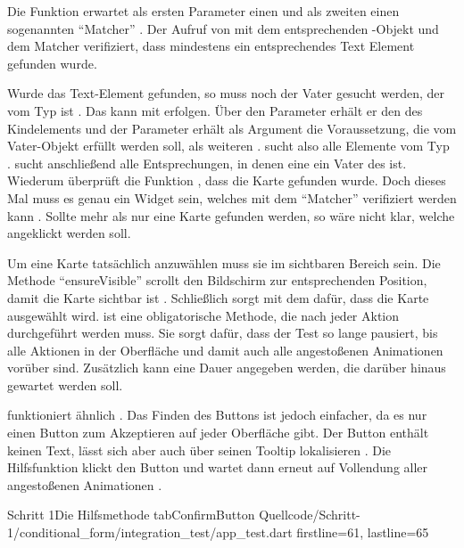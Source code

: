 Die Funktion  erwartet als ersten Parameter einen  und als zweiten einen sogenannten \enquote{Matcher} .
Der Aufruf von  mit dem entsprechenden -Objekt und dem Matcher  verifiziert, dass mindestens ein entsprechendes Text Element gefunden wurde.

Wurde das Text-Element gefunden, so muss noch der Vater gesucht werden, der vom Typ  ist .
Das kann mit  erfolgen. Über den Parameter  erhält er den  des Kindelements und der Parameter  erhält als Argument die Voraussetzung, die vom Vater-Objekt erfüllt werden soll, als weiteren .  sucht also alle Elemente vom Typ .  sucht anschließend alle Entsprechungen, in denen eine  ein Vater des  ist. Wiederum überprüft die Funktion , dass die Karte gefunden wurde. Doch dieses Mal muss es genau ein Widget sein, welches mit dem \enquote{Matcher}  verifiziert werden kann . Sollte mehr als nur eine Karte gefunden werden, so wäre nicht klar, welche angeklickt werden soll.

Um eine Karte tatsächlich anzuwählen muss sie im sichtbaren Bereich sein.
Die Methode \enquote{ensureVisible} scrollt den Bildschirm zur entsprechenden Position, damit die Karte sichtbar ist .
Schließlich sorgt  mit dem   dafür, dass die Karte ausgewählt wird.   ist eine obligatorische Methode, die nach jeder Aktion durchgeführt werden muss. Sie sorgt dafür, dass der Test so lange pausiert, bis alle Aktionen in der Oberfläche und damit auch alle angestoßenen Animationen vorüber sind. Zusätzlich kann eine Dauer angegeben werden, die darüber hinaus gewartet werden soll. 

 funktioniert ähnlich \Lst{\ref{lst:Schritt1HilfsmethodeTabSelectionCard}}.
Das Finden des Buttons ist jedoch einfacher, da es nur einen Button zum Akzeptieren auf jeder Oberfläche gibt.
Der Button enthält keinen Text, lässt sich aber auch über seinen Tooltip lokalisieren .
Die Hilfsfunktion klickt den Button  und wartet dann erneut auf Vollendung aller angestoßenen Animationen .

\begin{alexlisting}{Schritt 1}{Die Hilfsmethode tabConfirmButton}
  {Quellcode/Schritt-1/conditional_form/integration_test/app_test.dart}
  {firstline=61, lastline=65}
  \label{lst:Schritt1HilfsmethodeTabSelectionCard}
\end{alexlisting}

